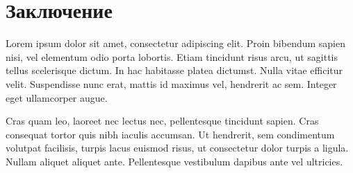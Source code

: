 \documentclass[a4paper,14pt]{extarticle}
\begin{document}
\newpage
\section*{Заключение}

Lorem ipsum dolor sit amet, consectetur adipiscing elit. Proin bibendum sapien nisi, vel elementum odio porta lobortis. Etiam tincidunt risus arcu, ut sagittis tellus scelerisque dictum. In hac habitasse platea dictumst. Nulla vitae efficitur velit. Suspendisse nunc erat, mattis id maximus vel, hendrerit ac sem. Integer eget ullamcorper augue.

Cras quam leo, laoreet nec lectus nec, pellentesque tincidunt sapien. Cras consequat tortor quis nibh iaculis accumsan. Ut hendrerit, sem condimentum volutpat facilisis, turpis lacus euismod risus, ut consectetur dolor turpis a ligula. Nullam aliquet aliquet ante. Pellentesque vestibulum dapibus ante vel ultricies.

\newpage
{}
\printbibliography
\end{document}

